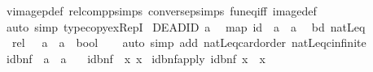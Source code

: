 \begin{isabellebody}
\ vimage{}p{\isacharunderscore}{\kern0pt}def\ relcompp{\isachardot}{\kern0pt}simps\ conversep{\isachardot}{\kern0pt}simps\ fun{\isacharunderscore}{\kern0pt}eq{\isacharunderscore}{\kern0pt}iff\ image{\isacharunderscore}{\kern0pt}def\isanewline
\ \ \isamarkupfalse%
\ {\isacharparenleft}{\kern0pt}auto\ simp{\isacharcolon}{\kern0pt}\ type{\isacharunderscore}{\kern0pt}copy{\isacharunderscore}{\kern0pt}ex{\isacharunderscore}{\kern0pt}RepI{\isacharparenright}{\kern0pt}%
\endisatagproof
{\isafoldproof}%
%
\isadelimproof
\isanewline
%
\endisadelimproof
\isanewline
{}\isamarkupfalse%
\isanewline
\isanewline
{}\isamarkupfalse%
\ DEADID{\isacharcolon}{\kern0pt}\ {\isacharprime}{\kern0pt}a\isanewline
\ \ map{\isacharcolon}{\kern0pt}\ {\isachardoublequoteopen}id\ {\isacharcolon}{\kern0pt}{\isacharcolon}{\kern0pt}\ {\isacharprime}{\kern0pt}a\ {\isasymRightarrow}\ {\isacharprime}{\kern0pt}a{\isachardoublequoteclose}\isanewline
\ \ bd{\isacharcolon}{\kern0pt}\ natLeq\isanewline
\ \ rel{\isacharcolon}{\kern0pt}\ {\isachardoublequoteopen}{\isacharparenleft}{\kern0pt}{\isacharequal}{\kern0pt}{\isacharparenright}{\kern0pt}\ {\isacharcolon}{\kern0pt}{\isacharcolon}{\kern0pt}\ {\isacharprime}{\kern0pt}a\ {\isasymRightarrow}\ {\isacharprime}{\kern0pt}a\ {\isasymRightarrow}\ bool{\isachardoublequoteclose}\isanewline
%
\isadelimproof
\ \ %
\endisadelimproof
%
\isatagproof
{}\isamarkupfalse%
\ {\isacharparenleft}{\kern0pt}auto\ simp\ add{\isacharcolon}{\kern0pt}\ natLeq{\isacharunderscore}{\kern0pt}card{\isacharunderscore}{\kern0pt}order\ natLeq{\isacharunderscore}{\kern0pt}cinfinite{\isacharparenright}{\kern0pt}%
\endisatagproof
{\isafoldproof}%
%
\isadelimproof
\isanewline
%
\endisadelimproof
\isanewline
{}\isamarkupfalse%
\ id{\isacharunderscore}{\kern0pt}bnf\ {\isacharcolon}{\kern0pt}{\isacharcolon}{\kern0pt}\ {\isachardoublequoteopen}{\isacharprime}{\kern0pt}a\ {\isasymRightarrow}\ {\isacharprime}{\kern0pt}a{\isachardoublequoteclose}\ \isanewline
\ \ {\isachardoublequoteopen}id{\isacharunderscore}{\kern0pt}bnf\ {\isasymequiv}\ {\isacharparenleft}{\kern0pt}{\isasymlambda}x{\isachardot}{\kern0pt}\ x{\isacharparenright}{\kern0pt}{\isachardoublequoteclose}\isanewline
\isanewline
{}\isamarkupfalse%
\ id{\isacharunderscore}{\kern0pt}bnf{\isacharunderscore}{\kern0pt}apply{\isacharcolon}{\kern0pt}\ {\isachardoublequoteopen}id{\isacharunderscore}{\kern0pt}bnf\ x\ {\isacharequal}{\kern0pt}\ x{\isachardoublequoteclose}\isanewline
%
\isadelimproof
\ \ %
\endisadelimproof

\end{isabellebody}
